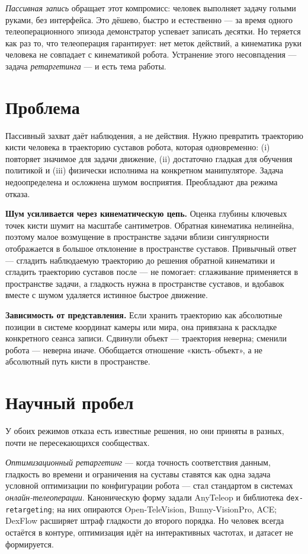 \documentclass[12pt, a4paper, oneside]{report}
\begin{document}
\emph{Пассивная запись} обращает этот компромисс: человек выполняет задачу голыми
руками, без интерфейса. Это дёшево, быстро и естественно --- за время одного
телеоперационного эпизода демонстратор успевает записать десятки. Но теряется как
раз то, что телеоперация гарантирует: нет меток действий, а кинематика руки
человека не совпадает с кинематикой робота. Устранение этого несовпадения ---
задача \emph{ретаргетинга} --- и есть тема работы.

\section{Проблема}

Пассивный захват даёт наблюдения, а не действия. Нужно превратить траекторию
кисти человека в траекторию суставов робота, которая одновременно: (i) повторяет
значимое для задачи движение, (ii) достаточно гладкая для обучения политикой и
(iii) физически исполнима на конкретном манипуляторе. Задача недоопределена и
осложнена шумом восприятия. Преобладают два режима отказа.

\textbf{Шум усиливается через кинематическую цепь.} Оценка глубины ключевых точек
кисти шумит на масштабе сантиметров. Обратная кинематика нелинейна, поэтому малое
возмущение в пространстве задачи вблизи сингулярности отображается в большое
отклонение в пространстве суставов. Привычный ответ --- сгладить наблюдаемую
траекторию до решения обратной кинематики и сгладить траекторию суставов после ---
не помогает: сглаживание применяется в пространстве задачи, а гладкость нужна в
пространстве суставов, и вдобавок вместе с шумом удаляется истинное быстрое
движение.

\textbf{Зависимость от представления.} Если хранить траекторию как абсолютные
позиции в системе координат камеры или мира, она привязана к раскладке конкретного
сеанса записи. Сдвинули объект --- траектория неверна; сменили робота --- неверна
иначе. Обобщается отношение «кисть--объект», а не абсолютный путь кисти в
пространстве.

\section{Научный пробел}

У обоих режимов отказа есть известные решения, но они приняты в разных, почти не
пересекающихся сообществах.

\emph{Оптимизационный ретаргетинг} --- когда точность соответствия данным,
гладкость во времени и ограничения на суставы ставятся как одна задача условной
оптимизации по конфигурации робота --- стал стандартом в системах
\emph{онлайн-телеоперации}. Каноническую форму задали AnyTeleop и библиотека
\texttt{dex-retargeting}; на них опираются Open-TeleVision, Bunny-VisionPro, ACE;
DexFlow расширяет штраф гладкости до второго порядка. Но человек всегда остаётся в
контуре, оптимизация идёт на интерактивных частотах, и датасет не формируется.
\end{document}
